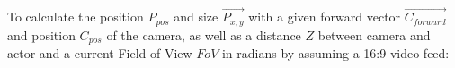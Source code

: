 To calculate the position $P_{pos}$ and size $\vec{P_{x, y}}$ with a 
given forward vector $\vec{C_{forward}}$ and position $C_{pos}$ of the 
camera, as well as a distance $Z$ between camera and actor and a current Field 
of View $FoV$ in radians by assuming a 16:9 video feed:


